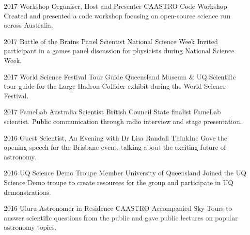 \documentclass[]{friggeri-cv} %
\begin{document}
\begin{entrylist}
\entry
    {2017}
    {Workshop Organiser, Host and Presenter}
    {CAASTRO Code Workshop}
    {Created and presented a code workshop focusing on open-source science run across Australia.}
\end{entrylist}
\begin{entrylist}
\entry
    {2017}
    {Battle of the Brains Panel Scientist}
    {National Science Week}
    {Invited participant in a games panel discussion for physicists during National Science Week.}
\end{entrylist}
\begin{entrylist}
\entry
    {2017}
    {World Science Festival Tour Guide}
    {Queensland Museum \& UQ}
    {Scientific tour guide for the Large Hadron Collider exhibit during the World Science Festival.}
\end{entrylist}
\begin{entrylist}
\entry
    {2017}
    {FameLab Australia Scientist}
    {British Council}
    {State finalist FameLab scientist. Public communication through radio interview and stage presentation.}
\end{entrylist}
\begin{entrylist}
\entry
    {2016}
    {Guest Scientist, An Evening with Dr Lisa Randall}
    {ThinkInc}
    {Gave the opening speech for the Brisbane event, talking about the exciting future of astronomy.}
\end{entrylist}
\begin{entrylist}
\entry
    {2016}
    {UQ Science Demo Troupe Member}
    {University of Queensland}
    {Joined the UQ Science Demo troupe to create resources for the group and participate in UQ demonstrations.}
\end{entrylist}
\begin{entrylist}
\entry
    {2016}
    {Uluru Astronomer in Residence}
    {CAASTRO}
    {Accompanied Sky Tours to answer scientific questions from the public and gave public lectures on popular astronomy topics.}
\end{entrylist}
\end{document}
